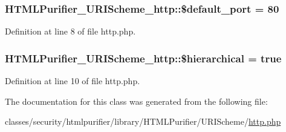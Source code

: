 \hypertarget{classHTMLPurifier__URIScheme__http_a01a76c2738847d030ef72d3176904df3}{
\subsubsection[{\$default\+\_\+port}]{\setlength{\rightskip}{0pt plus 5cm}H\+T\+M\+L\+Purifier\+\_\+\+U\+R\+I\+Scheme\+\_\+http\+::\$default\+\_\+port = 80}}\label{classHTMLPurifier__URIScheme__http_a01a76c2738847d030ef72d3176904df3}


Definition at line 8 of file http.\+php.

\hypertarget{classHTMLPurifier__URIScheme__http_af0af83918ca0e98aec3da6954eff982b}{
\subsubsection[{\$hierarchical}]{\setlength{\rightskip}{0pt plus 5cm}H\+T\+M\+L\+Purifier\+\_\+\+U\+R\+I\+Scheme\+\_\+http\+::\$hierarchical = true}}\label{classHTMLPurifier__URIScheme__http_af0af83918ca0e98aec3da6954eff982b}


Definition at line 10 of file http.\+php.



The documentation for this class was generated from the following file\+:\begin{DoxyCompactItemize}
\item 
classes/security/htmlpurifier/library/\+H\+T\+M\+L\+Purifier/\+U\+R\+I\+Scheme/\hyperlink{http_8php}{http.\+php}\end{DoxyCompactItemize}
